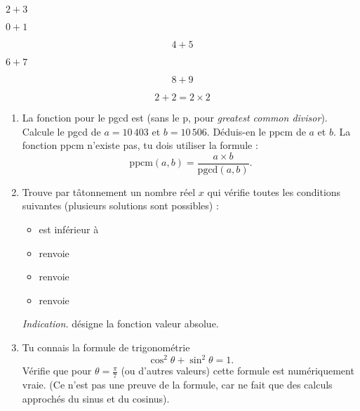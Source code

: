 

$2+3$

$0+1$

$$4+5$$

\(6+7\)

\[8+9\]

\begin{equation}
2+2 = 2 \times 2
\end{equation}

\begin{activite}


\begin{enumerate}
  \item  La fonction \Python{} pour le pgcd est  (sans le \og{}p\fg{}, pour \emph{greatest common divisor}). Calcule le pgcd de $a = 10\,403$ et $b = 10\,506$. Déduis-en le ppcm de $a$ et $b$. La fonction ppcm n'existe pas, tu dois utiliser la formule :
  $$\text{ppcm}(a,b) = \frac{a \times b}{\text{pgcd}(a,b)}.$$
  
  \item Trouve par tâtonnement un nombre réel $x$ qui vérifie toutes les conditions suivantes (plusieurs solutions sont possibles) :
  \begin{itemize}
    \item {} est inférieur à 
    \item {} renvoie 
    \item {} renvoie 
    \item {} renvoie  
  \end{itemize}
 
  \emph{Indication.}  désigne la fonction valeur absolue.
  
  \item Tu connais la formule de trigonométrie 
  $$\cos^2 \theta + \sin^2 \theta = 1.$$
  Vérifie que pour $\theta = \frac\pi7$ (ou d'autres valeurs) cette formule est numériquement vraie. (Ce n'est pas une preuve de la formule, car \Python{} ne fait que des calculs approchés du sinus et du cosinus).
\end{enumerate}  
\end{activite}
